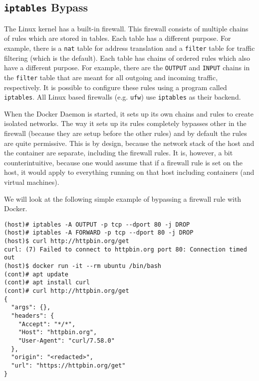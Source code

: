 \subsection{\texorpdfstring{\lstinline{iptables}}{iptables} Bypass}\label{subsection:iptables}
The Linux kernel has a built-in firewall. This firewall consists of multiple chains of rules which are stored in tables. Each table has a different purpose. For example, there is a \lstinline{nat} table for address translation and a \lstinline{filter} table for traffic filtering (which is the default).
Each table has chains of ordered rules which also have a different purpose. For example, there are the \lstinline{OUTPUT} and \lstinline{INPUT} chains in the \lstinline{filter} table that are meant for all outgoing and incoming traffic, respectively.
It is possible to configure these rules using a program called \lstinline{iptables}. All Linux based firewalls (e.g. \lstinline{ufw}) use \lstinline{iptables} as their backend.

\hfill

When the Docker Daemon is started, it sets up its own chains and rules to create isolated networks. The way it sets up its rules completely bypasses other in the firewall (because they are setup before the other rules) and by default the rules are quite permissive. This is by design, because the network stack of the host and the container are separate, including the firewall rules. It is, however, a bit counterintuitive, because one would assume that if a firewall rule is set on the host, it would apply to everything running on that host including containers (and virtual machines).

\hfill

We will look at the following simple example of bypassing a firewall rule with Docker.

\begin{lstlisting}[caption={Bypass \lstinline{iptables} firewall rules using Docker.},captionpos=b]
(host)# iptables -A OUTPUT -p tcp --dport 80 -j DROP
(host)# iptables -A FORWARD -p tcp --dport 80 -j DROP
(host)$ curl http://httpbin.org/get
curl: (7) Failed to connect to httpbin.org port 80: Connection timed out
(host)$ docker run -it --rm ubuntu /bin/bash
(cont)# apt update
(cont)# apt install curl
(cont)# curl http://httpbin.org/get
{
  "args": {},
  "headers": {
    "Accept": "*/*",
    "Host": "httpbin.org",
    "User-Agent": "curl/7.58.0"
  },
  "origin": "<redacted>",
  "url": "https://httpbin.org/get"
}
\end{lstlisting}

